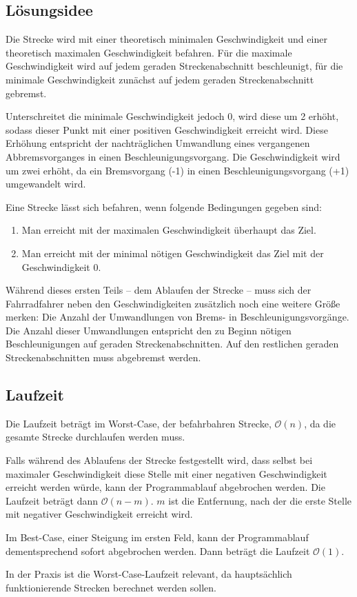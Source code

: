 \subsection {Lösungsidee}
	Die Strecke wird mit einer theoretisch minimalen Geschwindigkeit und einer theoretisch maximalen Geschwindigkeit befahren. 
	Für die maximale Geschwindigkeit wird auf jedem geraden Streckenabschnitt beschleunigt, für die minimale Geschwindigkeit zunächst auf jedem geraden Streckenabschnitt gebremst.

	Unterschreitet die minimale Geschwindigkeit jedoch 0, wird diese um 2 erhöht, sodass dieser Punkt mit einer positiven Geschwindigkeit erreicht wird.
	Diese Erhöhung entspricht der nachträglichen Umwandlung eines vergangenen Abbremsvorganges in einen Beschleunigungsvorgang. Die Geschwindigkeit wird um zwei erhöht, da ein Bremsvorgang (-1) in einen Beschleunigungsvorgang (+1) umgewandelt wird.
	
	Eine Strecke lässt sich befahren, wenn folgende Bedingungen gegeben sind:
	\begin{enumerate}
		\item Man erreicht mit der maximalen Geschwindigkeit überhaupt das Ziel.
		\item Man erreicht mit der minimal nötigen Geschwindigkeit das Ziel mit der Geschwindigkeit 0.
	\end{enumerate}

	Während dieses ersten Teils – dem Ablaufen der Strecke – muss sich der Fahrradfahrer neben den Geschwindigkeiten zusätzlich noch
	eine weitere Größe merken: Die Anzahl der Umwandlungen von Brems- in Beschleunigungsvorgänge. Die Anzahl dieser Umwandlungen entspricht
	den zu Beginn nötigen Beschleunigungen auf geraden Streckenabschnitten. Auf den restlichen geraden Streckenabschnitten muss abgebremst werden.
\subsection{Laufzeit}
	Die Laufzeit beträgt im Worst-Case, der befahrbahren Strecke, \(\mathcal O(n)\), da die gesamte Strecke durchlaufen werden muss.
	
	Falls während des Ablaufens der Strecke festgestellt wird, dass selbst bei maximaler Geschwindigkeit diese Stelle mit einer negativen Geschwindigkeit erreicht werden würde, kann der Programmablauf abgebrochen werden. Die Laufzeit beträgt dann \(\mathcal O(n-m)\). \(m\) ist die Entfernung, nach der die erste Stelle mit negativer Geschwindigkeit erreicht wird.
	
	Im Best-Case, einer Steigung im ersten Feld, kann der Programmablauf dementsprechend sofort abgebrochen werden. Dann beträgt die Laufzeit \(\mathcal O(1)\).
	
	In der Praxis ist die Worst-Case-Laufzeit relevant, da hauptsächlich funktionierende Strecken berechnet werden sollen. 
